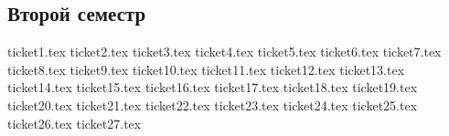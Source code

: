 \documentclass[12pt,letterpaper]{report}
\theoremstyle{definition}
\begin{document}
\newpage
\pagestyle{plain}
\fi
\tableofcontents
\newpage
\begin{normalsize}
\chapter*{Второй семестр}
{ticket1.tex}
{ticket2.tex}
{ticket3.tex}
{ticket4.tex}
{ticket5.tex}
{ticket6.tex}
{ticket7.tex}
{ticket8.tex}
{ticket9.tex}
{ticket10.tex}
{ticket11.tex}
{ticket12.tex}
{ticket13.tex}
{ticket14.tex}
{ticket15.tex}
{ticket16.tex}
{ticket17.tex}
{ticket18.tex}
{ticket19.tex}
{ticket20.tex}
{ticket21.tex}
{ticket22.tex}
{ticket23.tex}
{ticket24.tex}
{ticket25.tex}
{ticket26.tex}
{ticket27.tex}
\end{normalsize}
\end{document}
